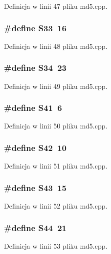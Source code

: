 Definicja w linii 47 pliku md5.cpp.\hypertarget{a00009_1c854214533f6220e859b0063196abb3}{
\subsubsection[{S33}]{\setlength{\rightskip}{0pt plus 5cm}\#define S33~16}}
\label{a00009_1c854214533f6220e859b0063196abb3}




Definicja w linii 48 pliku md5.cpp.\hypertarget{a00009_f6472be1d535970afee8e5266a74aa07}{
\subsubsection[{S34}]{\setlength{\rightskip}{0pt plus 5cm}\#define S34~23}}
\label{a00009_f6472be1d535970afee8e5266a74aa07}




Definicja w linii 49 pliku md5.cpp.\hypertarget{a00009_b674ba129e588da55d1d494e1cf3c15e}{
\subsubsection[{S41}]{\setlength{\rightskip}{0pt plus 5cm}\#define S41~6}}
\label{a00009_b674ba129e588da55d1d494e1cf3c15e}




Definicja w linii 50 pliku md5.cpp.\hypertarget{a00009_268ef1a49114a94b931cc6b313e3cd1b}{
\subsubsection[{S42}]{\setlength{\rightskip}{0pt plus 5cm}\#define S42~10}}
\label{a00009_268ef1a49114a94b931cc6b313e3cd1b}




Definicja w linii 51 pliku md5.cpp.\hypertarget{a00009_5aaa7121f39650d472746942ca68f959}{
\subsubsection[{S43}]{\setlength{\rightskip}{0pt plus 5cm}\#define S43~15}}
\label{a00009_5aaa7121f39650d472746942ca68f959}




Definicja w linii 52 pliku md5.cpp.\hypertarget{a00009_6a3989af72b55d169bd73a66f8620aae}{
\subsubsection[{S44}]{\setlength{\rightskip}{0pt plus 5cm}\#define S44~21}}
\label{a00009_6a3989af72b55d169bd73a66f8620aae}




Definicja w linii 53 pliku md5.cpp.